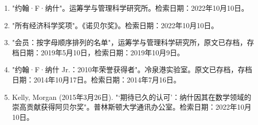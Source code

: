 \begin{enumerate}
\item "约翰·F·纳什"。运筹学与管理科学研究所。检索日期：2022年10月10日。
\item "所有经济科学奖项"。《诺贝尔奖》。检索日期：2022年10月10日。
\item "会员：按字母顺序排列的名单"，运筹学与管理科学研究所，原文已存档，存档日期：2019年5月10日，检索日期：2019年10月9日。
\item "约翰·F·纳什 Jr.：2010年荣誉获得者"。冷泉港实验室。原文已存档，存档日期：2014年10月17日。检索日期：2014年7月16日。
\item Kelly, Morgan (2015年3月26日). "‘期待已久的认可’：纳什因其在数学领域的崇高贡献获得阿贝尔奖"。普林斯顿大学通讯办公室。检索日期：2022年10月10日。
\end{enumerate}
